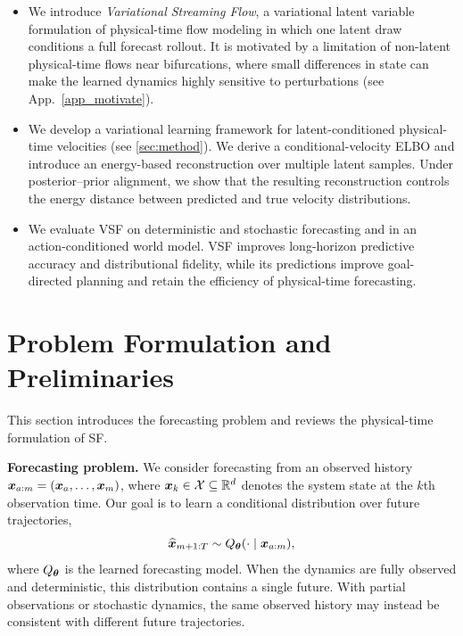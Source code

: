 \begin{itemize}[leftmargin=*]

\item We introduce \emph{Variational Streaming Flow}, a variational latent
variable formulation of physical-time flow modeling in which one latent draw
conditions a full forecast rollout. It is motivated by a limitation of
non-latent physical-time flows near bifurcations, where small differences in
state can make the learned dynamics highly sensitive to perturbations
(see App.~\ref{app_motivate}).

\item We develop a variational learning framework for latent-conditioned
physical-time velocities (see \cref{sec:method}). We derive a
conditional-velocity ELBO and introduce an energy-based reconstruction over
multiple latent samples. Under posterior--prior alignment, we show that the
resulting reconstruction controls the energy distance between predicted and
true velocity distributions.

\item We evaluate VSF on deterministic and stochastic forecasting and in an
action-conditioned world model. VSF improves long-horizon predictive accuracy
and distributional fidelity, while its predictions improve goal-directed
planning and retain the efficiency of physical-time forecasting.

\end{itemize}





\section{Problem Formulation and Preliminaries}
\label{sec:preliminaries}

This section introduces the forecasting problem and reviews the physical-time formulation of SF. 

\textbf{Forecasting problem.}
We consider forecasting from an observed history
${\bm{x}}_{a:m}=({\bm{x}}_a,\ldots,{\bm{x}}_m)$, where
${\bm{x}}_k\in\mathcal X\subseteq\mathbb{R}^d$ denotes the system state at the $k$th
observation time. Our goal is to learn a conditional distribution over future
trajectories,
\begin{equation}
    \widehat{{\bm{x}}}_{m+1:T}
    \sim
    Q_{{\bm{\theta}}}(\cdot\mid{\bm{x}}_{a:m}),
    \label{eq:forecasting_problem}
\end{equation}
where $Q_{{\bm{\theta}}}$ is the learned forecasting model. When the dynamics are
fully observed and deterministic, this distribution contains a single future.
With partial observations or stochastic dynamics, the same observed history
may instead be consistent with 
different future trajectories.

